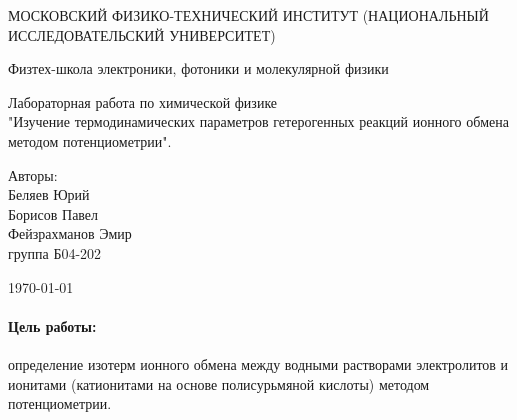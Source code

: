 \documentclass[a4paper,12pt]{article} %
\date{\today}
\begin{document}
\begin{titlepage}
	\begin{center}
		{\large МОСКОВСКИЙ ФИЗИКО-ТЕХНИЧЕСКИЙ ИНСТИТУТ (НАЦИОНАЛЬНЫЙ ИССЛЕДОВАТЕЛЬСКИЙ УНИВЕРСИТЕТ)}
	\end{center}
	\begin{center}
		{\large Физтех-школа электроники, фотоники и молекулярной физики}
	\end{center}
	
	
	\vspace{4.5cm}
	{\huge
		\begin{center}
			{Лабораторная работа по химической физике}\\
                {"Изучение термодинамических параметров гетерогенных
реакций ионного обмена методом потенциометрии".}\\
		\end{center}
	}
	\vspace{2cm}
	\begin{flushright}
		{\LARGE Авторы:\\ Беляев Юрий \\ Борисов Павел  \\
		Фейзрахманов Эмир \\	\vspace{0.2cm}
			группа Б04-202}
	\end{flushright}
	\vspace{7cm}
	\begin{center}
		\today
	\end{center}
\end{titlepage}




\paragraph{Цель работы:} 
 определение изотерм ионного обмена между водными растворами электролитов
и ионитами (катионитами на основе полисурьмяной кислоты) методом потенциометрии.
\end{document}
